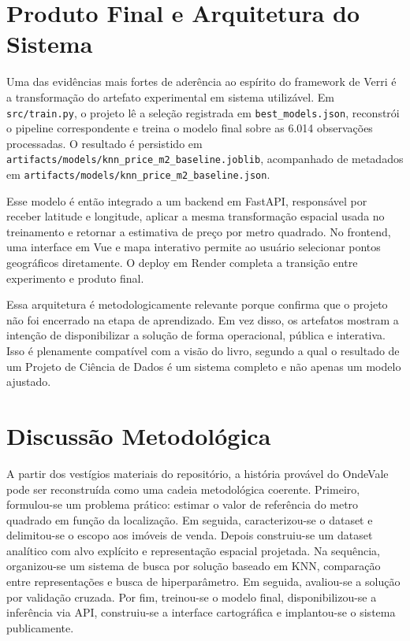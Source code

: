 \documentclass[12pt]{report}
\begin{document}
\chapter{Produto Final e Arquitetura do Sistema}

Uma das evidências mais fortes de aderência ao espírito do framework de Verri é a transformação do artefato experimental em sistema utilizável. Em \texttt{src/train.py}, o projeto lê a seleção registrada em \texttt{best\_models.json}, reconstrói o pipeline correspondente e treina o modelo final sobre as 6.014 observações processadas. O resultado é persistido em \texttt{artifacts/models/knn\_price\_m2\_baseline.joblib}, acompanhado de metadados em \texttt{artifacts/models/knn\_price\_m2\_baseline.json}.

Esse modelo é então integrado a um backend em FastAPI, responsável por receber latitude e longitude, aplicar a mesma transformação espacial usada no treinamento e retornar a estimativa de preço por metro quadrado. No frontend, uma interface em Vue e mapa interativo permite ao usuário selecionar pontos geográficos diretamente. O deploy em Render completa a transição entre experimento e produto final.

Essa arquitetura é metodologicamente relevante porque confirma que o projeto não foi encerrado na etapa de aprendizado. Em vez disso, os artefatos mostram a intenção de disponibilizar a solução de forma operacional, pública e interativa. Isso é plenamente compatível com a visão do livro, segundo a qual o resultado de um Projeto de Ciência de Dados é um sistema completo e não apenas um modelo ajustado.

\chapter{Discussão Metodológica}

A partir dos vestígios materiais do repositório, a história provável do OndeVale pode ser reconstruída como uma cadeia metodológica coerente. Primeiro, formulou-se um problema prático: estimar o valor de referência do metro quadrado em função da localização. Em seguida, caracterizou-se o dataset e delimitou-se o escopo aos imóveis de venda. Depois construiu-se um dataset analítico com alvo explícito e representação espacial projetada. Na sequência, organizou-se um sistema de busca por solução baseado em KNN, comparação entre representações e busca de hiperparâmetro. Em seguida, avaliou-se a solução por validação cruzada. Por fim, treinou-se o modelo final, disponibilizou-se a inferência via API, construiu-se a interface cartográfica e implantou-se o sistema publicamente.
\end{document}
